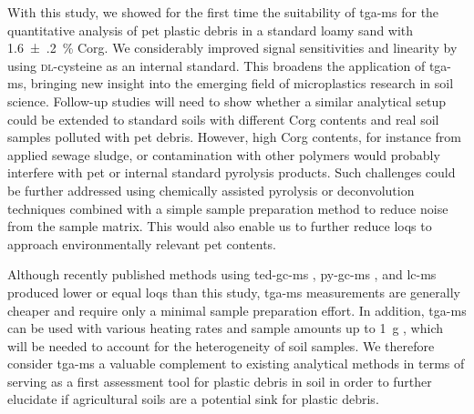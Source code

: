 With this study, we showed for the first time the suitability of \ac{tga-ms} for the quantitative analysis of \ac{pet} plastic debris in a standard loamy sand with \SI{1.6(2)}{\percent} \ac{Corg}. We considerably improved signal sensitivities and linearity by using \textsc{dl}-cysteine as an internal standard. This broadens the application of \ac{tga-ms}, bringing new insight into the emerging field of microplastics research in soil science. Follow-up studies will need to show whether a similar analytical setup could be extended to standard soils with different \ac{Corg} contents and real soil samples polluted with \ac{pet} debris. However, high \ac{Corg} contents, for instance from applied sewage sludge, or contamination with other polymers would probably interfere with \ac{pet} or internal standard pyrolysis products. Such challenges could be further addressed using chemically assisted pyrolysis or deconvolution techniques combined with a simple sample preparation method to reduce noise from the sample matrix. This would also enable us to further reduce \acp{loq} to approach environmentally relevant \ac{pet} contents.

Although recently published methods using \ac{ted-gc-ms} \citep{DumichenAnalysis2015}, \ac{py-gc-ms} \citep{FischerSimultaneous2017}, and \ac{lc-ms} \citep{WangSimple2017} produced lower or equal \acp{loq} than this study, \ac{tga-ms} measurements are generally cheaper and require only a minimal sample preparation effort. In addition, \ac{tga-ms} can be used with various heating rates and sample amounts up to \SI{1}{\gram} \citep{JakabThermal2003}, which will be needed to account for the heterogeneity of soil samples.
We therefore consider \ac{tga-ms} a valuable complement to existing analytical methods in terms of serving as a first assessment tool for plastic debris in soil in order to further elucidate if agricultural soils are a potential sink for plastic debris.
